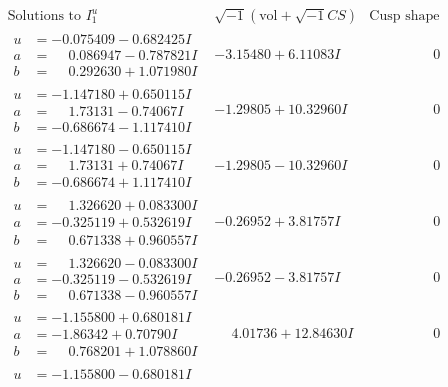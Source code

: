 \documentclass[1p]{elsarticle_modified}
\theoremstyle{definition}
\newcommand{\I}{\sqrt{-1}}
\begin{document}
$$\begin{array}{c|c|c}
\text{Solutions to }I^u_{1}& \I (\text{vol} + \sqrt{-1}CS) & \text{Cusp shape}\\
 \hline 
\begin{aligned}
u &= -0.075409 - 0.682425 I \\
a &= \phantom{-}0.086947 - 0.787821 I \\
b &= \phantom{-}0.292630 + 1.071980 I\end{aligned}
 & -3.15480 + 6.11083 I & \phantom{-0.000000 } 0 \\ \hline\begin{aligned}
u &= -1.147180 + 0.650115 I \\
a &= \phantom{-}1.73131 - 0.74067 I \\
b &= -0.686674 - 1.117410 I\end{aligned}
 & -1.29805 + 10.32960 I & \phantom{-0.000000 } 0 \\ \hline\begin{aligned}
u &= -1.147180 - 0.650115 I \\
a &= \phantom{-}1.73131 + 0.74067 I \\
b &= -0.686674 + 1.117410 I\end{aligned}
 & -1.29805 - 10.32960 I & \phantom{-0.000000 } 0 \\ \hline\begin{aligned}
u &= \phantom{-}1.326620 + 0.083300 I \\
a &= -0.325119 + 0.532619 I \\
b &= \phantom{-}0.671338 + 0.960557 I\end{aligned}
 & -0.26952 + 3.81757 I & \phantom{-0.000000 } 0 \\ \hline\begin{aligned}
u &= \phantom{-}1.326620 - 0.083300 I \\
a &= -0.325119 - 0.532619 I \\
b &= \phantom{-}0.671338 - 0.960557 I\end{aligned}
 & -0.26952 - 3.81757 I & \phantom{-0.000000 } 0 \\ \hline\begin{aligned}
u &= -1.155800 + 0.680181 I \\
a &= -1.86342 + 0.70790 I \\
b &= \phantom{-}0.768201 + 1.078860 I\end{aligned}
 & \phantom{-}4.01736 + 12.84630 I & \phantom{-0.000000 } 0 \\ \hline\begin{aligned}
u &= -1.155800 - 0.680181 I \\

\end{aligned}
\end{array}$$
\end{document}
